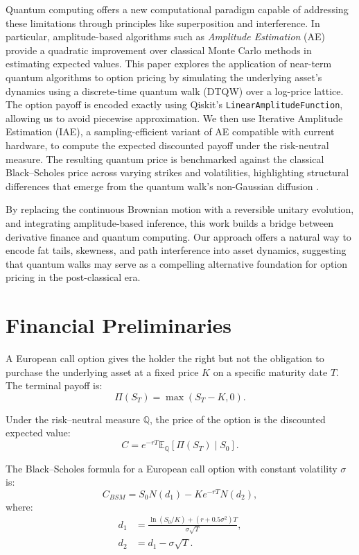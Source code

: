 \documentclass[11pt]{article}
\begin{document}
Quantum computing offers a new computational paradigm capable of addressing these limitations through principles like superposition and interference. In particular, amplitude-based algorithms such as \emph{Amplitude Estimation} (AE) provide a quadratic improvement over classical Monte Carlo methods in estimating expected values. This paper explores the application of near-term quantum algorithms to option pricing by simulating the underlying asset's dynamics using a discrete-time quantum walk (DTQW) over a log-price lattice. The option payoff is encoded exactly using Qiskit's \texttt{LinearAmplitudeFunction}, allowing us to avoid piecewise approximation. We then use Iterative Amplitude Estimation (IAE), a sampling-efficient variant of AE compatible with current hardware, to compute the expected discounted payoff under the risk-neutral measure. The resulting quantum price is benchmarked against the classical Black--Scholes price across varying strikes and volatilities, highlighting structural differences that emerge from the quantum walk’s non-Gaussian diffusion \cite{wang2022quantum}.

By replacing the continuous Brownian motion with a reversible unitary evolution, and integrating amplitude-based inference, this work builds a bridge between derivative finance and quantum computing. Our approach offers a natural way to encode fat tails, skewness, and path interference into asset dynamics, suggesting that quantum walks may serve as a compelling alternative foundation for option pricing in the post-classical era.


\section{Financial Preliminaries}
A European call option gives the holder the right but not the obligation to purchase the underlying
asset at a fixed price $K$ on a specific maturity date $T$. The terminal payoff
is:
\begin{equation}
\Pi(S_T) = \max(S_T - K, 0).
\end{equation}

Under the risk--neutral measure $\mathbb{Q}$, the price of the option is the
discounted expected value:
\begin{equation}
C = e^{-rT} \mathbb{E}_\mathbb{Q}[\Pi(S_T)\mid S_0].
\end{equation}

The Black--Scholes formula for a European call option with constant volatility
$\sigma$ is:
\begin{equation}
C_{BSM} = S_0 N(d_1) - K e^{-rT} N(d_2),
\end{equation}
where:
\begin{align}
d_1 &= \frac{\ln(S_0/K) + (r + 0.5\sigma^2)T}{\sigma \sqrt{T}}, \\
d_2 &= d_1 - \sigma \sqrt{T}.
\end{align}
\end{document}
